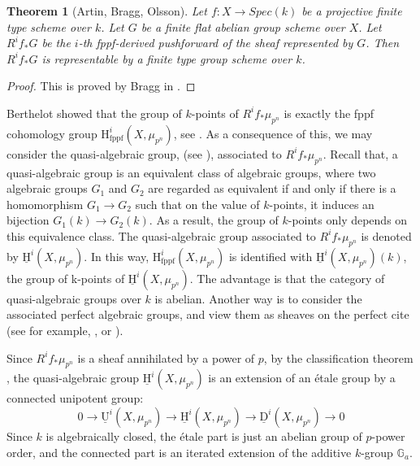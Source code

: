 \documentclass[a4paper,12pt,twoside]{report}
\newtheorem{theorem}{Theorem}[section]
\newcommand{\G}{\mathbb{G}}
\newcommand{\uU}{\underline{\mathrm{U}}}
\newcommand{\uH}{\underline{\mathrm{H}}}
\newcommand{\uD}{\underline{\mathrm{D}}}
\newcommand{\fppf}{\mathrm{fppf}}
\newcommand{\HH}{\mathrm{H}}
\begin{document}
\begin{theorem}[Artin, Bragg, Olsson] \label{rep} 
    Let $f:X\rightarrow Spec(k)$ be a projective finite type scheme over $k$.
    Let $G$ be a finite flat abelian group scheme over $X$. Let $R^if_*G$ be the $i$-th 
    fppf-derived pushforward of the sheaf represented by $G$. 
    Then $R^if_*G$ is representable by a finite type group scheme over $k$. 
\end{theorem}
\begin{proof} This is proved by Bragg in \cite[Corollary 1.6]{BO}. \end{proof}

\medskip

Berthelot showed that the group of $k$-points of $R^if_*\mu_{p^n}$ is 
exactly the fppf cohomology group $\HH^i_{\fppf}(X,\mu_{p^n})$, see \cite[Corollary 2.10]{Be}. 
As a consequence of this, we may consider the quasi-algebraic group, (see
\cite{Se}), associated to $R^if_*\mu_{p^n}$. 
Recall that, a quasi-algebraic group is an equivalent class of algebraic groups, where two algebraic groups $G_1$ and $G_2$ are 
regarded as equivalent
if and only if there is a homomorphism $G_1\rightarrow  G_2$ such that on the value of $k$-points, it induces an bijection $G_1(k)\rightarrow G_2(k)$. 
As a result, the group of $k$-points only depends on this equivalence class. 
The quasi-algebraic group associated to $R^if_*\mu_{p^n}$ 
is denoted by $\uH^i(X,\mu_{p^n})$. In this way, $\HH^i_{\fppf}(X,\mu_{p^n})$ is identified with $\uH^i(X,\mu_{p^n})(k)$, the group of k-points of $\uH^i(X,\mu_{p^n})$. 
The advantage is that the category of quasi-algebraic groups over $k$ is abelian. 
Another way is to consider the associated perfect algebraic groups, 
and view them as sheaves on the perfect cite 
(see for example, \cite[Section 2.7]{Be}, or \cite[p.~192]{IR}). 


Since $R^if_*\mu_{p^n}$ is a sheaf annihilated by a power of $p$, by the classification theorem \cite[Proposition 7, p.~10]{Se},
the quasi-algebraic group $\uH ^i(X,\mu_{p^n})$ is an extension of an \'etale group
by a connected unipotent group: 
\begin{equation}
0\rightarrow \uU ^i(X,\mu_{p^n}) \rightarrow \uH ^i(X,\mu_{p^n}) \rightarrow \uD ^i(X,\mu_{p^n}) \rightarrow 0
\end{equation}
Since $k$ is algebraically closed, the \'etale part is just an abelian group of $p$-power order, 
and the connected part is an iterated extension of the additive $k$-group $\G_a$. 
\end{document}
